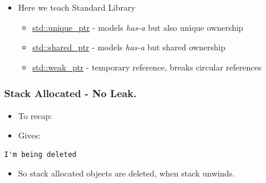\begin{itemize}
\tightlist
\item
  Here we teach Standard Library

  \begin{itemize}
  \tightlist
  \item
    \href{http://en.cppreference.com/w/cpp/memory/unique_ptr}{std::unique\_ptr}
    - models \emph{has-a} but also unique ownership
  \item
    \href{http://en.cppreference.com/w/cpp/memory/shared_ptr}{std::shared\_ptr}
    - models \emph{has-a} but shared ownership
  \item
    \href{http://en.cppreference.com/w/cpp/memory/weak_ptr}{std::weak\_ptr}
    - temporary reference, breaks circular references
  \end{itemize}
\end{itemize}

\hypertarget{stack-allocated---no-leak.}{%
\subsubsection{Stack Allocated - No
Leak.}\label{stack-allocated---no-leak.}}

\begin{itemize}
\tightlist
\item
  To recap:
\end{itemize}

\begin{Shaded}
\begin{Highlighting}[]
\NormalTok{,}\NormalTok{);}
\NormalTok{\}}

\end{Highlighting}
\end{Shaded}

\begin{itemize}
\tightlist
\item
  Gives:
\end{itemize}

\begin{verbatim}
I'm being deleted
\end{verbatim}

\begin{itemize}
\tightlist
\item
  So stack allocated objects are deleted, when stack unwinds.
\end{itemize}

